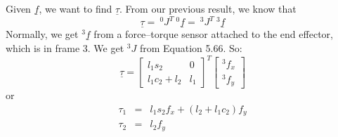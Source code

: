 \documentclass[]{article}
\begin{document}
Given $\underline{f}$, we want to find $\underline{\tau}$. From our previous result, we know that
\begin{displaymath}
\underline{\tau} = \ \!^{0}J^{T}\ ^{0}\underline{f} = \ \!^{3}J^{T}\ ^{3}\underline{f}
\end{displaymath}
Normally, we get $^{3}\underline{f}$ from a force--torque sensor attached to the end effector, which is in frame 3. We get $^{3}J$ from Equation 5.66. So:
\begin{displaymath}
\underline{\tau} = \left[ \begin{array}{cc} l_{1}s_{2} & 0 \\ l_{1}c_{2} + l_{2} & l_{1}\end{array}\right]^{T}\left[\begin{array}{c} ^{3}f_{x} \\ ^{3}f_{y} \end{array}\right]
\end{displaymath}
or
\begin{eqnarray}
	\tau_{1} & = & l_{1}s_{2}f_{x} + (l_{2}+l_{1}c_{2})f_{y} \nonumber\\
	\tau_{2} & = & l_{2}f_{y} \nonumber
\end{eqnarray}
\end{document}
